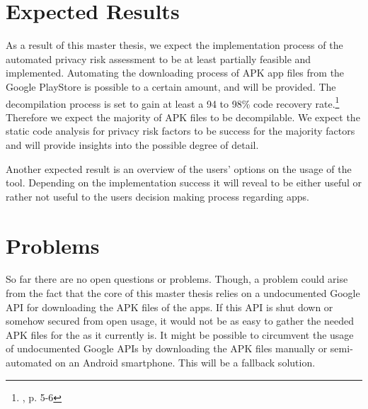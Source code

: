 \documentclass[
	a4paper,
	oneside,
	12pt,
	liststotocnumbered
]{article}
\let\cite\textcite
\begin{document}
\section{Expected Results}

As a result of this master thesis, we expect the implementation process of the automated privacy risk assessment to be at least partially feasible and implemented. 
Automating the downloading process of \acs{APK} app files from the Google PlayStore is possible to a certain amount, and will be provided.
The decompilation process is set to gain at least a 94 to 98\% code recovery rate.\footnote{\cite{Enck2011}, p. 5-6} 
Therefore we expect the majority of \acs{APK} files to be decompilable.
We expect the static code analysis for privacy risk factors to be success for the majority factors and will provide insights into the possible degree of detail.

Another expected result is an overview of the users' options on the usage of the tool. 
Depending on the implementation success it will reveal to be either useful or rather not useful to the users decision making process regarding \mH apps.

\section{Problems}
So far there are no open questions or problems. Though, a problem could arise from the fact that the core of this master thesis relies on a undocumented Google \acs{API} for downloading the \acs{APK} files of the apps. 
If this \acs{API} is shut down or somehow secured from open usage, it would not be as easy to gather the needed \acs{APK} files for the \sca as it currently is.
It might be possible to circumvent the usage of undocumented Google \acs{API}s by downloading the \acs{APK} files manually or semi-automated on an Android smartphone. 
This will be a fallback solution.

\newpage
\printbibliography[title={References}]
\end{document}
